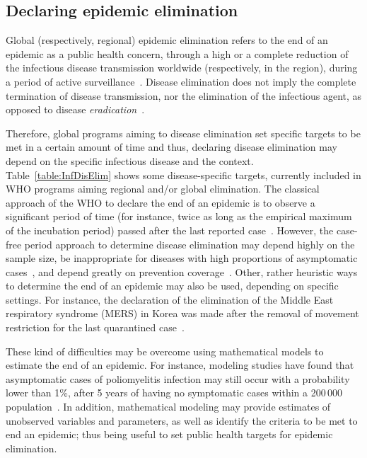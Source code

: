 \subsection{Declaring epidemic elimination}  \label{Intro:EpiElim}

Global (respectively, regional) epidemic elimination refers to the end of an epidemic as a public health concern, through a high or a complete reduction of the infectious disease transmission worldwide (respectively, in the region), during a period of active surveillance~\cite[]{Porta2014,Nishiura2016}. Disease elimination does not imply the complete termination of disease transmission, nor the elimination of the infectious agent, as opposed to disease \emph{eradication}~\cite[]{Porta2014}. 

Therefore, global programs aiming to disease elimination set specific targets to be met in a certain amount of time and thus, declaring disease elimination may depend on the specific infectious disease and the context. %
Table~\ref{table:InfDisElim} shows some disease-specific targets, currently included in WHO programs aiming regional and/or global elimination.
The classical approach of the WHO to declare the end of an epidemic is to observe a significant period of time (for instance, twice as long as the empirical maximum of the incubation period) passed after the last reported case~\cite[]{Nishiura2016}. However, the case-free period approach to determine disease elimination may depend highly on the sample size, be inappropriate for diseases with high proportions of asymptomatic cases~\cite[]{Nishiura2016}, and depend greatly on prevention coverage~\cite[]{Eichner1996}. Other, rather heuristic ways to determine the end of an epidemic may also be used, depending on specific settings. For instance, the declaration of the elimination of the Middle East respiratory syndrome (MERS) in Korea was made after the removal of movement restriction for the last quarantined case~\cite[]{Nishiura2016}.

These kind of difficulties may be overcome using mathematical models to estimate the end of an epidemic. For instance, modeling studies have found that asymptomatic cases of poliomyelitis infection may still occur with a probability lower than 1\%, after 5 years of having no symptomatic cases within a 200\,000 population~\cite[]{Eichner1996}. In addition, mathematical modeling may provide estimates of unobserved variables and parameters, as well as identify the criteria to be met to end an epidemic; thus being useful to set public health targets for epidemic elimination.

